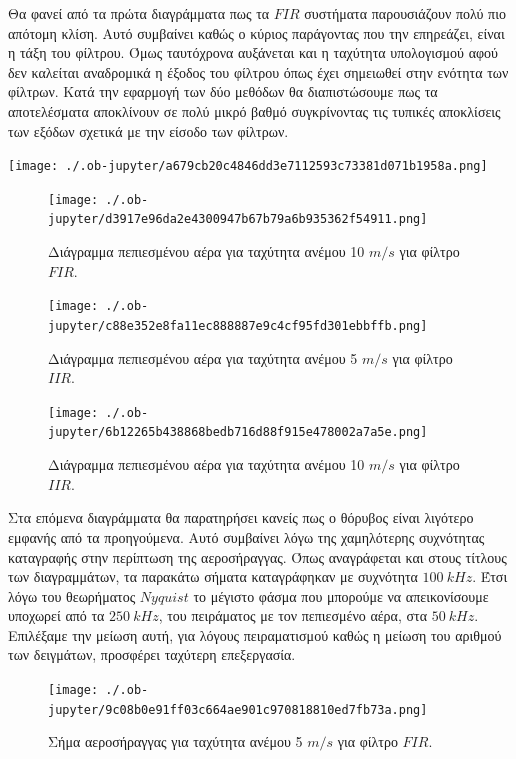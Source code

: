 \documentclass[breaklines=true, 12pt]{article}
\begin{document}
{{{Θα φανεί από τα πρώτα διαγράμματα πως τα \(FIR\) συστήματα παρουσιάζουν πολύ
πιο απότομη κλίση. Αυτό συμβαίνει καθώς ο κύριος παράγοντας που την επηρεάζει,
είναι η τάξη του φίλτρου. Όμως ταυτόχρονα αυξάνεται και η ταχύτητα υπολογισμού
αφού δεν καλείται αναδρομικά η έξοδος του φίλτρου όπως έχει σημειωθεί στην
ενότητα των φίλτρων. Κατά την εφαρμογή των δύο μεθόδων θα διαπιστώσουμε πως τα
αποτελέσματα αποκλίνουν σε πολύ μικρό βαθμό συγκρίνοντας τις τυπικές
αποκλίσεις των εξόδων σχετικά με την είσοδο των φίλτρων.

\begin{center}
\texttt{[image: ./.ob-jupyter/a679cb20c4846dd3e7112593c73381d071b1958a.png]}
\end{center}

\begin{figure}[htbp]
\centering
\texttt{[image: ./.ob-jupyter/d3917e96da2e4300947b67b79a6b935362f54911.png]}
\caption{\label{fc1_10_ref}Διάγραμμα πεπιεσμένου αέρα για ταχύτητα ανέμου 10 \(m/s\) για φίλτρο \(FIR\).}
\end{figure}

\begin{figure}[htbp]
\centering
\texttt{[image: ./.ob-jupyter/c88e352e8fa11ec888887e9c4cf95fd301ebbffb.png]}
\caption{\label{ic1_5}Διάγραμμα πεπιεσμένου αέρα για ταχύτητα ανέμου 5 \(m/s\) για φίλτρο \(IIR\).}
\end{figure}

\begin{figure}[H]
\centering
\texttt{[image: ./.ob-jupyter/6b12265b438868bedb716d88f915e478002a7a5e.png]}
\caption{\label{ic1_10}Διάγραμμα πεπιεσμένου αέρα για ταχύτητα ανέμου 10 \(m/s\) για φίλτρο \(IIR\).}
\end{figure}

Στα επόμενα διαγράμματα θα παρατηρήσει κανείς πως ο θόρυβος είναι λιγότερο εμφανής από τα
προηγούμενα. Αυτό συμβαίνει λόγω της χαμηλότερης συχνότητας
καταγραφής στην περίπτωση της αεροσήραγγας. Όπως αναγράφεται και στους
τίτλους των διαγραμμάτων, τα παρακάτω σήματα καταγράφηκαν με συχνότητα
\(100\ kHz\). Έτσι λόγω του θεωρήματος \(Nyquist\) το μέγιστο φάσμα που
μπορούμε να απεικονίσουμε υποχωρεί από τα \(250\ kHz\), του πειράματος με
τον πεπιεσμένο αέρα, στα \(50\ kHz\). Επιλέξαμε την μείωση αυτή, για
λόγους πειραματισμού καθώς η μείωση του αριθμού των δειγμάτων, προσφέρει
ταχύτερη επεξεργασία.
\begin{figure}[b]
\centering
\texttt{[image: ./.ob-jupyter/9c08b0e91ff03c664ae901c970818810ed7fb73a.png]}
\caption{\label{fi1_5}Σήμα αεροσήραγγας για ταχύτητα ανέμου 5 \(m/s\) για φίλτρο \(FIR\).}
\end{figure}

}}}
\end{document}
